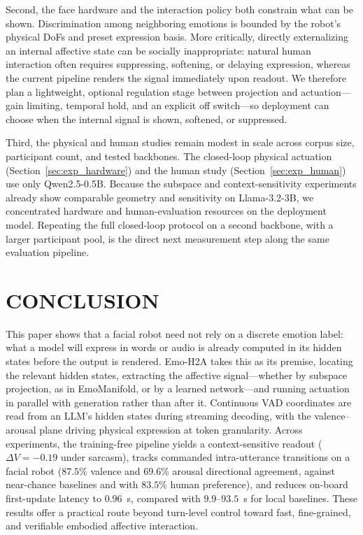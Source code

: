 \documentclass[letterpaper, 10 pt, conference]{ieeeconf/ieeeconf}
\begin{document}
\addtolength{\textheight}{-4.5cm}

Second, the face hardware and the interaction policy both constrain what can be shown. Discrimination among neighboring emotions is bounded by the robot's physical DoFs and preset expression basis. More critically, directly externalizing an internal affective state can be socially inappropriate: natural human interaction often requires suppressing, softening, or delaying expression, whereas the current pipeline renders the signal immediately upon readout. We therefore plan a lightweight, optional regulation stage between projection and actuation---gain limiting, temporal hold, and an explicit off switch---so deployment can choose when the internal signal is shown, softened, or suppressed.

Third, the physical and human studies remain modest in scale across corpus size, participant count, and tested backbones. The closed-loop physical actuation (Section~\ref{sec:exp_hardware}) and the human study (Section~\ref{sec:exp_human}) use only Qwen2.5-0.5B. Because the subspace and context-sensitivity experiments already show comparable geometry and sensitivity on Llama-3.2-3B, we concentrated hardware and human-evaluation resources on the deployment model. Repeating the full closed-loop protocol on a second backbone, with a larger participant pool, is the direct next measurement step along the same evaluation pipeline.

\section{CONCLUSION}
\label{sec:conclusion}

This paper shows that a facial robot need not rely on a discrete emotion label: what a model will express in words or audio is already computed in its hidden states before the output is rendered. Emo-H2A takes this as its premise, locating the relevant hidden states, extracting the affective signal---whether by subspace projection, as in EmoManifold, or by a learned network---and running actuation in parallel with generation rather than after it. Continuous VAD coordinates are read from an LLM's hidden states during streaming decoding, with the valence--arousal plane driving physical expression at token granularity. Across experiments, the training-free pipeline yields a context-sensitive readout ($\Delta V{=}-0.19$ under sarcasm), tracks commanded intra-utterance transitions on a facial robot ($87.5\%$ valence and $69.6\%$ arousal directional agreement, against near-chance baselines and with $83.5\%$ human preference), and reduces on-board first-update latency to $0.96$~s, compared with $9.9$--$93.5$~s for local baselines. These results offer a practical route beyond turn-level control toward fast, fine-grained, and verifiable embodied affective interaction.



\end{document}
